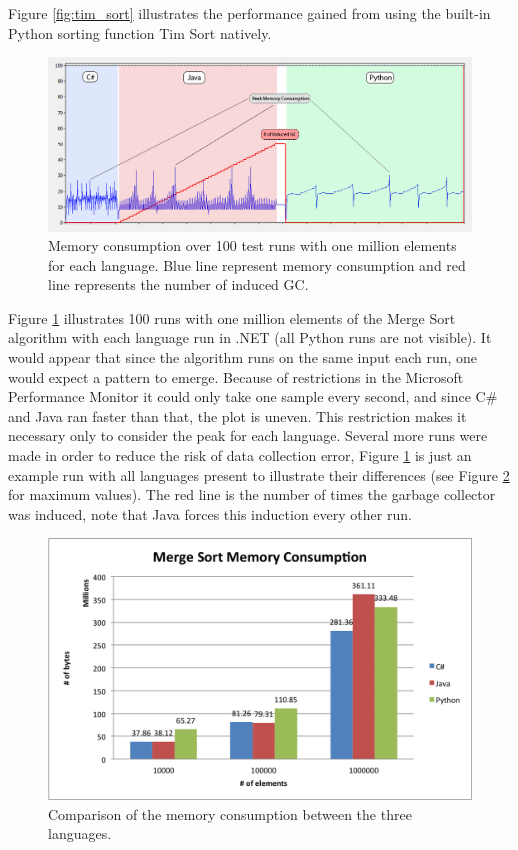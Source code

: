 Figure \ref{fig:tim_sort} illustrates the performance gained from using the built-in Python sorting function Tim Sort natively. 



\begin{figure}[h]
	\centering
	\includegraphics[width=1.0\textwidth]{chapters/media/mergesort_memory_1mil_all.png}
	\caption{Memory consumption over 100 test runs with one million elements for each language. Blue line represent memory consumption and red line represents the number of induced GC.}
	\label{fig:merge_sort_memory_all}
\end{figure}


Figure \ref{fig:merge_sort_memory_all} illustrates 100 runs with one million elements of the Merge Sort algorithm with each language run in .NET (all Python runs are not visible). It would appear that since the algorithm runs on the same input each run, one would expect a pattern to emerge. Because of restrictions in the Microsoft Performance Monitor it could only take one sample every second, and since C\# and Java ran faster than that, the plot is uneven.  This restriction makes it necessary only to consider the peak for each language. Several more runs were made in order to reduce the risk of data collection error, Figure \ref{fig:merge_sort_memory_all} is just an example run with all languages present to illustrate their differences (see Figure \ref{fig:merge_sort_memory} for  maximum values). The red line is the number of times the garbage collector was induced, note that Java forces this induction every other run.


\begin{figure}[h]
	\centering
	\includegraphics[width=1.0\textwidth]{chapters/media/merge_sort_memory.png}
	\caption{Comparison of the memory consumption between the three languages.}
	\label{fig:merge_sort_memory}
\end{figure}

